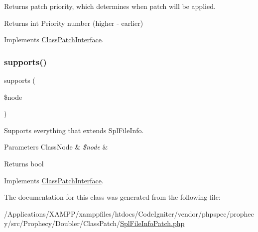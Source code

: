 Returns patch priority, which determines when patch will be applied.

\begin{DoxyReturn}{Returns}
int Priority number (higher -\/ earlier) 
\end{DoxyReturn}


Implements \mbox{\hyperlink{interface_prophecy_1_1_doubler_1_1_class_patch_1_1_class_patch_interface_a1e7a3c168dcd0901a0d2669c67575b55}{Class\+Patch\+Interface}}.

\mbox{\label{class_prophecy_1_1_doubler_1_1_class_patch_1_1_spl_file_info_patch_a99b2455ac194faf79aff042c55719ac2}} 
\subsubsection{\texorpdfstring{supports()}{supports()}}
{\footnotesize\ttfamily supports (\begin{DoxyParamCaption}\item[{\mbox{\hyperlink{class_prophecy_1_1_doubler_1_1_generator_1_1_node_1_1_class_node}{Class\+Node}}}]{\$node }\end{DoxyParamCaption})}

Supports everything that extends Spl\+File\+Info.


\begin{DoxyParams}[1]{Parameters}
Class\+Node & {\em \$node} & \\
\hline
\end{DoxyParams}
\begin{DoxyReturn}{Returns}
bool 
\end{DoxyReturn}


Implements \mbox{\hyperlink{interface_prophecy_1_1_doubler_1_1_class_patch_1_1_class_patch_interface_a99b2455ac194faf79aff042c55719ac2}{Class\+Patch\+Interface}}.



The documentation for this class was generated from the following file\+:\begin{DoxyCompactItemize}
\item 
/\+Applications/\+X\+A\+M\+P\+P/xamppfiles/htdocs/\+Code\+Igniter/vendor/phpspec/prophecy/src/\+Prophecy/\+Doubler/\+Class\+Patch/\mbox{\hyperlink{_spl_file_info_patch_8php}{Spl\+File\+Info\+Patch.\+php}}\end{DoxyCompactItemize}
